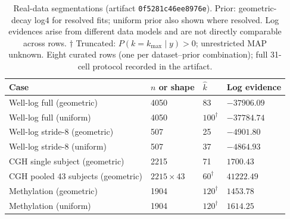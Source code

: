 \begin{table}[!htbp]
\centering
\small
\caption{Real-data segmentations (artifact \texttt{0f5281c46ee8976e}). Prior: geometric-decay log4 for resolved fits; uniform prior also shown where resolved. Log evidences arise from different data models and are not directly comparable across rows. $\dagger$ Truncated: $P(k=k_{\max}\mid y) > 0$; unrestricted MAP unknown. Eight curated rows (one per dataset--prior combination); full 31-cell protocol recorded in the artifact.}
\label{tab:real-summary-paper}
\begin{tabularx}{\columnwidth}{@{}Y C{0.19\columnwidth} C{0.12\columnwidth} C{0.28\columnwidth}@{}}
\toprule
Case & $n$ or shape & $\widehat k$ & Log evidence \\
\midrule
Well-log full (geometric) & 4050 & 83 & $-37906.09$ \\
Well-log full (uniform) & 4050 & $100^{\dagger}$ & $-37784.74$ \\
Well-log stride-8 (geometric) & 507 & 25 & $-4901.80$ \\
Well-log stride-8 (uniform) & 507 & 37 & $-4864.93$ \\
CGH single subject (geometric) & 2215 & 71 & $1700.43$ \\
CGH pooled 43 subjects (geometric) & $2215\times43$ & $60^{\dagger}$ & $41222.49$ \\
Methylation (geometric) & 1904 & $120^{\dagger}$ & $1453.78$ \\
Methylation (uniform) & 1904 & $120^{\dagger}$ & $1614.25$ \\
\bottomrule
\end{tabularx}
\end{table}
